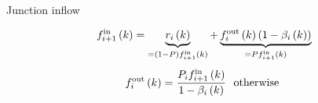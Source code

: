 \documentclass[xcolor=svgnames, english, smaller]{beamer}
\theoremstyle{plain}
\theoremstyle{definition}
\theoremstyle{plain}
\theoremstyle{plain}
\newcommand \Fontvi{\fontsize{8}{8}\selectfont}
\newcommand \systemDiagOffset{-1.8in}
\newcommand \systemDiagResizeMult{1.3}
\begin{document}
\begin{frame}{Junction inflow}

\Fontvi

\begin{figure}[t]
\hspace{\systemDiagOffset}
\resizebox{\systemDiagResizeMult\columnwidth}{!}{}
\label{fig:system}
\end{figure}

\begin{minipage}[t]{0.46\linewidth}
\begin{figure}[h]
\centering
\resizebox{0.8\columnwidth}{!}{
	
}
\label{fig:junctionBuffer-junctionFlows}
\end{figure}
\end{minipage}\hfill
\begin{minipage}[t]{0.50\linewidth}
\begin{align}
&& f_{i+1}^{\text{in}}\left(k\right) & =  \underbrace{r_{i}\left(k\right)}_{=(1-P)f_{i+1}^{\text{in}}\left(k\right)} + \underbrace{f_{i}^{\text{out}}\left(k\right)\left(1-\beta_{i}\left(k\right)\right)}_{=Pf_{i+1}^{\text{in}}\left(k\right)}& \nonumber 
\end{align}
\pause \begin{align}
&& f_{i}^{\text{out}}\left(k\right) &= \frac{P_{i}f_{i+1}^{\text{in}}\left(k\right)}{1-\beta_{i}\left(k\right)} \ \ \text{otherwise }\nonumber 
\end{align}
\end{minipage}

\end{frame}
\end{document}
